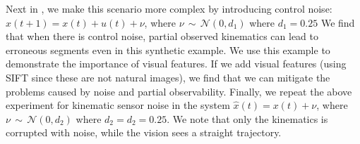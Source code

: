 \documentclass[0-main.tex]{subfiles}
\begin{document}
Next in , we make this scenario more complex by introducing control noise:
$x(t+1) = x(t)+u(t)+\nu$, where $\nu\, \sim\, \mathcal{N}(0, d_1)$ where $d_1=0.25$
We find that when there is control noise, partial observed kinematics can lead to erroneous segments even in this synthetic example.
We use this example to demonstrate the importance of visual features.
If we add visual features (using SIFT since these are not natural images), we find that we can mitigate the problems caused by noise and partial observability.
Finally, we repeat the above experiment for kinematic sensor noise in the system $\hat{x}(t)= x(t)+\nu$, where $\nu\, \sim\, \mathcal{N}(0, d_2)$ where $d_2 = d_2=0.25$. We note that only the kinematics is corrupted with noise, while the vision sees a straight trajectory. 

\end{document}

